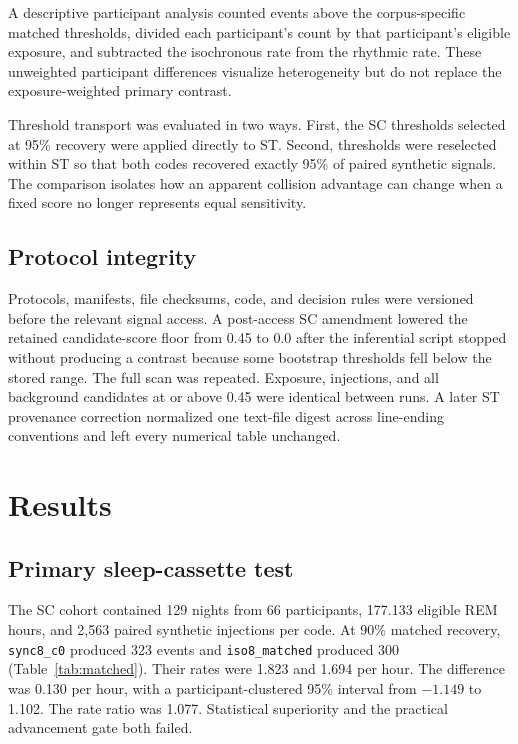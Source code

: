 \documentclass[10pt,twocolumn]{article}
\begin{document}
A descriptive participant analysis counted events above the corpus-specific matched thresholds, divided each participant's count by that participant's eligible exposure, and subtracted the isochronous rate from the rhythmic rate. These unweighted participant differences visualize heterogeneity but do not replace the exposure-weighted primary contrast.

Threshold transport was evaluated in two ways. First, the SC thresholds selected at 95\% recovery were applied directly to ST. Second, thresholds were reselected within ST so that both codes recovered exactly 95\% of paired synthetic signals. The comparison isolates how an apparent collision advantage can change when a fixed score no longer represents equal sensitivity.

\subsection{Protocol integrity}

Protocols, manifests, file checksums, code, and decision rules were versioned before the relevant signal access. A post-access SC amendment lowered the retained candidate-score floor from 0.45 to 0.0 after the inferential script stopped without producing a contrast because some bootstrap thresholds fell below the stored range. The full scan was repeated. Exposure, injections, and all background candidates at or above 0.45 were identical between runs. A later ST provenance correction normalized one text-file digest across line-ending conventions and left every numerical table unchanged.

\section{Results}

\subsection{Primary sleep-cassette test}

The SC cohort contained 129 nights from 66 participants, 177.133 eligible REM hours, and 2,563 paired synthetic injections per code. At 90\% matched recovery, \texttt{sync8\_c0} produced 323 events and \texttt{iso8\_matched} produced 300 (Table~\ref{tab:matched}). Their rates were 1.823 and 1.694 per hour. The difference was 0.130 per hour, with a participant-clustered 95\% interval from $-1.149$ to 1.102. The rate ratio was 1.077. Statistical superiority and the practical advancement gate both failed.
\end{document}
